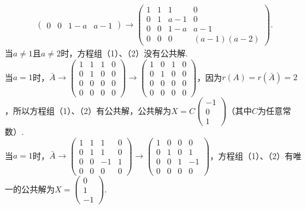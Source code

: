 \begin{enumerate}
\begin{align*}
\begin{pmatrix}
                0 & 0 & 1-a & a-1
            \end{pmatrix}\rightarrow\begin{pmatrix}
                1 & 1 & 1 & 0\\
                0 & 1 & a-1 & 0 \\
                0 & 0 & 1-a & a-1\\
                0 & 0 & 0 & (a-1)(a-2)
            \end{pmatrix}.
        \end{align*}
        当$a\neq 1$且$a\neq 2$时，方程组（1）、（2）没有公共解.\\
        当$a=1$时，$\bar{A}\rightarrow\begin{pmatrix}
            1 & 1 & 1 & 0 \\
            0 & 1 & 0 & 0 \\
            0 & 0 & 0 & 0 \\
            0 & 0 & 0 & 0
        \end{pmatrix}\rightarrow\begin{pmatrix}
            1 & 0 & 1 & 0 \\
            0 & 1 & 0 & 0 \\
            0 & 0 & 0 & 0 \\
            0 & 0 & 0 & 0
        \end{pmatrix}$，因为$r(A)=r(\bar{A})=2$，所以方程组（1）、（2）有公共解，公共解为$X=C\begin{pmatrix}
            -1 \\
            0 \\
            1
        \end{pmatrix}$（其中$C$为任意常数）.\\
        当$a=1$时，$\bar{A}\rightarrow\begin{pmatrix}
            1 & 1 & 1 & 0 \\
            0 & 1 & 1 & 0 \\
            0 & 0 & -1 & 1 \\
            0 & 0 & 0 & 0
        \end{pmatrix}\rightarrow\begin{pmatrix}
            1 & 0 & 0 & 0 \\
            0 & 1 & 0 & 1 \\
            0 & 0 & 1 & -1 \\
            0 & 0 & 0 & 0
        \end{pmatrix}$，方程组（1）、（2）有唯一的公共解为$X=\begin{pmatrix}
            0 \\
            1 \\
            -1
        \end{pmatrix}.$
\end{enumerate}

